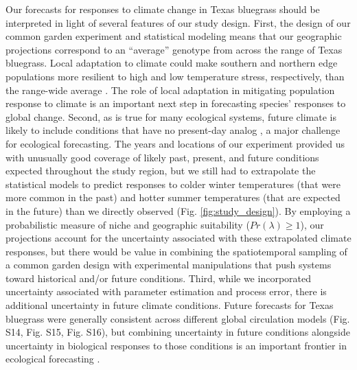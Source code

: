 \documentclass[9pt,twocolumn,twoside,lineno]{pnas-new}
\begin{document}
Our forecasts for responses to climate change in Texas bluegrass should be interpreted in light of several features of our study design. 
First, the design of our common garden experiment and statistical modeling means that our geographic projections correspond to an ``average'' genotype from across the range of Texas bluegrass. 
Local adaptation to climate could make southern and northern edge populations more resilient to high and low temperature stress, respectively, than the range-wide average \citep{angert2020we}. 
The role of local adaptation in mitigating population response to climate is an important next step in forecasting species' responses to global change.
Second, as is true for many ecological systems, future climate is likely to include conditions that have no present-day analog \citep{intergovernmental_panel_on_climate_change_ipcc_climate_2023}, a major challenge for ecological forecasting. 
The years and locations of our experiment provided us with unusually good coverage of likely past, present, and future conditions expected throughout the study region, but we still had to extrapolate the statistical models to predict responses to colder winter temperatures (that were more common in the past) and hotter summer temperatures (that are expected in the future) than we directly observed (Fig. \ref{fig:study_design}). 
By employing a probabilistic measure of niche and geographic suitability ($Pr(\lambda)\ge1$), our projections account for the uncertainty associated with these extrapolated climate responses, but there would be value in combining the spatiotemporal sampling of a common garden design with experimental manipulations that push systems toward historical and/or future conditions. 
Third, while we incorporated uncertainty associated with parameter estimation and process error, there is additional uncertainty in future climate conditions. 
Future forecasts for Texas bluegrass were generally consistent across different global circulation models (Fig. S14, Fig. S15, Fig. S16), but combining uncertainty in future conditions alongside uncertainty in biological responses to those conditions is an important frontier in ecological forecasting \citep{dietze2018iterative}. 
\end{document}
